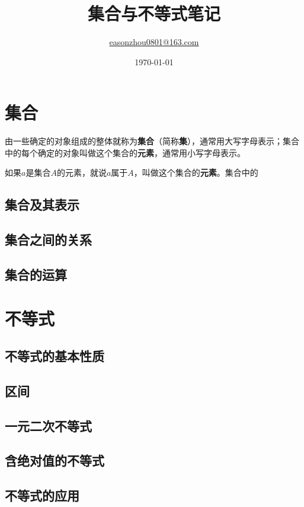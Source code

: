 \documentclass[a5paper]{article}
\title{\Huge \textbf{集合与不等式笔记}}
\author{\href{https://github.com/Zhou-Yi-Xuan}{easonzhou0801@163.com}}
\date{\today}
\begin{document}
\maketitle

\section{集合}

由一些确定的对象组成的整体就称为\textbf{集合}（简称\textbf{集}），通常用大写字母表示；集合中的每个确定的对象叫做这个集合的\textbf{元素}，通常用小写字母表示。

如果$a$是集合$A$的元素，就说$a \text{属于} A$，叫做这个集合的\textbf{元素}。集合中的

\subsection{集合及其表示}

\subsection{集合之间的关系}

\subsection{集合的运算}

\section{不等式}

\subsection{不等式的基本性质}

\subsection{区间}

\subsection{一元二次不等式}

\subsection{含绝对值的不等式}

\subsection{不等式的应用}
\end{document}
